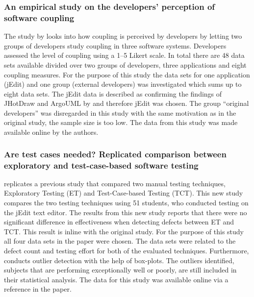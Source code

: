 \subsubsection{An empirical study on the developers' perception of software coupling}
The study by \citet{bavota2013empirical} looks into how coupling is perceived by developers by letting two groups of developers study coupling in three software systems. Developers assessed the level of coupling using a 1--5 Likert scale. In total there are 48 data sets available divided over two groups of developers, three applications and eight coupling measures. For the purpose of this study the data sets for one application (jEdit) and one group (external developers) was investigated which sums up to eight data sets. The jEdit data is described as confirming the findings of JHotDraw and ArgoUML by \citet{bavota2013empirical} and therefore jEdit was chosen. The group ``original developers'' was disregarded in this study with the same motivation as in the original study, the sample size is too low. The data from this study was made available online by the authors.




\subsubsection{Are test cases needed? Replicated comparison between exploratory and test-case-based software testing} 
\citet{itkonen2013test} replicates a previous study that compared two manual testing techniques, Exploratory Testing (ET) and Test-Case-based Testing (TCT). This new study compares the two testing techniques using 51 students, who conducted testing on the jEdit text editor. The results from this new study reports that there were no significant difference in effectiveness when detecting defects between ET and TCT\@. This result is inline with the original study. For the purpose of this study all four data sets in the paper were chosen. The data sets were related to the defect count and testing effort for both of the evaluated techniques. Furthermore, \citet{itkonen2013test} conducts outlier detection with the help of box-plots. The outliers identified, subjects that are performing exceptionally well or poorly, are still included in their statistical analysis. The data for this study was available online via a reference in the paper.




